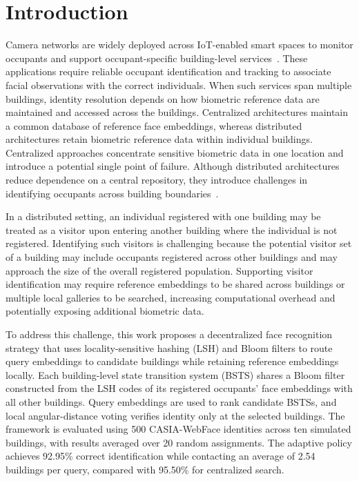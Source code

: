 \documentclass[pdflatex,sn-mathphys-num]{sn-jnl}%
\theoremstyle{thmstyleone}%
\theoremstyle{thmstyletwo}%
\theoremstyle{thmstylethree}%
\begin{document}
\maketitle


\section{Introduction}

Camera networks are widely deployed across IoT-enabled smart spaces to monitor occupants and support occupant-specific building-level services~\cite{SM2022,hou2017}. These applications require reliable occupant identification and tracking to associate facial observations with the correct individuals. When such services span multiple buildings, identity resolution depends on how biometric reference data are maintained and accessed across the buildings. Centralized architectures maintain a common database of reference face embeddings, whereas distributed architectures retain biometric reference data within individual buildings. Centralized approaches concentrate sensitive biometric data in one location and introduce a potential single point of failure. Although distributed architectures reduce dependence on a central repository, they introduce challenges in identifying occupants across building boundaries~\cite{mohan2020}.

In a distributed setting, an individual registered with one building may be treated as a visitor upon entering another building where the individual is not registered. Identifying such visitors is challenging because the potential visitor set of a building may include occupants registered across other buildings and may approach the size of the overall registered population. Supporting visitor identification may require reference embeddings to be shared across buildings or multiple local galleries to be searched, increasing computational overhead and potentially exposing additional biometric data.


To address this challenge, this work proposes a decentralized face recognition strategy that uses locality-sensitive hashing (LSH) and Bloom filters to route query embeddings to candidate buildings while retaining reference embeddings locally. Each building-level state transition system (BSTS) shares a Bloom filter constructed from the LSH codes of its registered occupants' face embeddings with all other buildings. Query embeddings are used to rank candidate BSTSs, and local angular-distance voting verifies identity only at the selected buildings. The framework is evaluated using 500 CASIA-WebFace identities across ten simulated buildings, with results averaged over 20 random assignments. The adaptive policy achieves 92.95\% correct identification while contacting an average of 2.54 buildings per query, compared with 95.50\% for centralized search.
\end{document}
